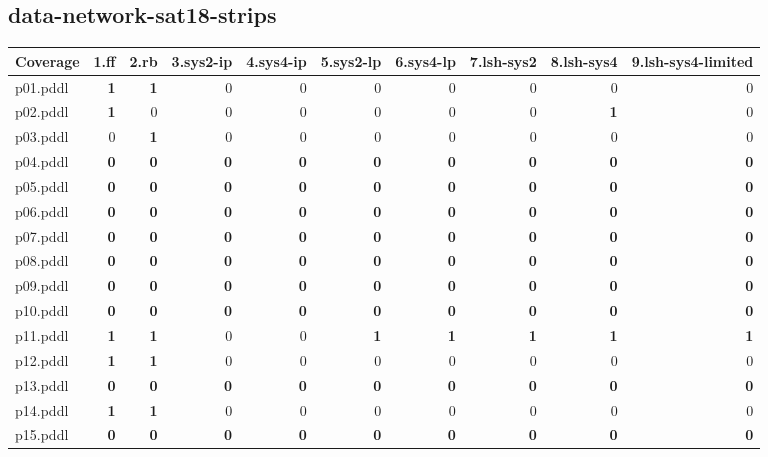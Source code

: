 \documentclass{article}
\begin{document}
\hypertarget{coverage-data-network-sat18-strips}{}
\subsection*{data-network-sat18-strips}

\begin{tabular}{@{}lrrrrrrrrr@{}}
Coverage & 1.ff & 2.rb & 3.sys2-ip & 4.sys4-ip & 5.sys2-lp & 6.sys4-lp & 7.lsh-sys2 & 8.lsh-sys4 & 9.lsh-sys4-limited \\
\midrule
p01.pddl & \textbf{1} & \textbf{1} & 0 & 0 & 0 & 0 & 0 & 0 & 0 \\
p02.pddl & \textbf{1} & 0 & 0 & 0 & 0 & 0 & 0 & \textbf{1} & 0 \\
p03.pddl & 0 & \textbf{1} & 0 & 0 & 0 & 0 & 0 & 0 & 0 \\
p04.pddl & \textbf{0} & \textbf{0} & \textbf{0} & \textbf{0} & \textbf{0} & \textbf{0} & \textbf{0} & \textbf{0} & \textbf{0} \\
p05.pddl & \textbf{0} & \textbf{0} & \textbf{0} & \textbf{0} & \textbf{0} & \textbf{0} & \textbf{0} & \textbf{0} & \textbf{0} \\
p06.pddl & \textbf{0} & \textbf{0} & \textbf{0} & \textbf{0} & \textbf{0} & \textbf{0} & \textbf{0} & \textbf{0} & \textbf{0} \\
p07.pddl & \textbf{0} & \textbf{0} & \textbf{0} & \textbf{0} & \textbf{0} & \textbf{0} & \textbf{0} & \textbf{0} & \textbf{0} \\
p08.pddl & \textbf{0} & \textbf{0} & \textbf{0} & \textbf{0} & \textbf{0} & \textbf{0} & \textbf{0} & \textbf{0} & \textbf{0} \\
p09.pddl & \textbf{0} & \textbf{0} & \textbf{0} & \textbf{0} & \textbf{0} & \textbf{0} & \textbf{0} & \textbf{0} & \textbf{0} \\
p10.pddl & \textbf{0} & \textbf{0} & \textbf{0} & \textbf{0} & \textbf{0} & \textbf{0} & \textbf{0} & \textbf{0} & \textbf{0} \\
p11.pddl & \textbf{1} & \textbf{1} & 0 & 0 & \textbf{1} & \textbf{1} & \textbf{1} & \textbf{1} & \textbf{1} \\
p12.pddl & \textbf{1} & \textbf{1} & 0 & 0 & 0 & 0 & 0 & 0 & 0 \\
p13.pddl & \textbf{0} & \textbf{0} & \textbf{0} & \textbf{0} & \textbf{0} & \textbf{0} & \textbf{0} & \textbf{0} & \textbf{0} \\
p14.pddl & \textbf{1} & \textbf{1} & 0 & 0 & 0 & 0 & 0 & 0 & 0 \\
p15.pddl & \textbf{0} & \textbf{0} & \textbf{0} & \textbf{0} & \textbf{0} & \textbf{0} & \textbf{0} & \textbf{0} & \textbf{0} \\

\end{tabular}
\end{document}
